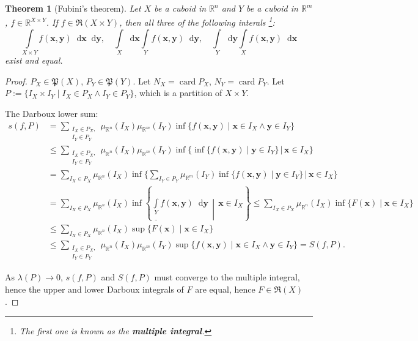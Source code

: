 \documentclass[openany]{book}
\newcommand*{\indexbf}[1]{\emph{\textbf{#1}}\index{#1}} %
\theoremstyle{plain}
\newtheorem{theorem}{Theorem}[section] %
\theoremstyle{definition}
\newcommand{\dif}{\mathop{}\!\mathrm{d}} %
\newcommand*{\bv}{\boldsymbol} %
\DeclareMathOperator{\card}{card}
\begin{document}
\begin{theorem}[Fubini's theorem]
	\label{theorem: Fubini's theorem}
	Let $X$ be a cuboid in $\mathbb R^n$ and $Y$ be a cuboid in $\mathbb R^m$, $f \in \mathbb R^{X \times Y}$. 
	If $f \in \mathfrak R(X \times Y)$, then all three of the following interals%
		\footnote{The first one is known as the \indexbf{multiple integral}.}:
	\begin{equation*}
		\int\limits_{X \times Y} f(\bv x, \bv y) \dif \bv x \dif \bv y, 
		\quad
		\int\limits_X \dif \bv x \int\limits_Y  f(\bv x, \bv y)  \dif \bv y, 
		\quad
		\int\limits_Y \dif \bv y \int\limits_X  f(\bv x, \bv y)  \dif \bv x
	\end{equation*}
	exist and equal.
\end{theorem}
\begin{proof}
	$P_X \in \mathfrak P(X)$, $P_Y \in \mathfrak P(Y)$. 
	Let $N_X = \card P_X$, $N_Y = \card P_Y$.
	Let $P := \{I_X \times I_Y \mid I_X \in P_X \wedge I_Y \in P_Y\}$, which is a partition of $X \times Y$.
	
	The Darboux lower sum:
	\begin{align*}
		s(f, P) &= \sum_{\substack{I_X \in P_X,\\ I_Y \in P_Y}} \mu_{\mathbb R^n}(I_X) \mu_{\mathbb R^m}(I_Y)
			\inf\{f(\bv x, \bv y) \mid \bv x \in I_X \wedge \bv y \in I_Y\}
		\\
		&\leq \sum_{\substack{I_X \in P_X,\\ I_Y \in P_Y}} 
			\mu_{\mathbb R^n}(I_X) \mu_{\mathbb R^m}(I_Y)
			\inf \big\{ \inf \{f(\bv x, \bv y) \mid \bv y \in I_Y  \} 
				\,\big\vert\, \bv x \in I_X \big\}
		\\
		&= \sum_{I_X \in P_X} \mu_{\mathbb R^n}(I_X) 
			\inf \bigg\{ \sum_{I_Y \in P_Y} \mu_{\mathbb R^m}(I_Y) 
				\inf \{ f(\bv x, \bv y) \mid  \bv y \in I_Y\} 
			\,\bigg\vert\, \bv x \in I_X \bigg\}
		\\
		&= \sum_{I_X \in P_X} \mu_{\mathbb R^n}(I_X) 
			\inf \left\{ 
				\underline{\int\limits_Y} f(\bv x, \bv y) \dif \bv y
			\,\middle\vert\, 
				\bv x \in I_X 
			\right\} 
		\leq \sum_{I_X \in P_X} \mu_{\mathbb R^n}(I_X) 
			\inf \{ F(\bv x) \mid \bv x \in I_X \}
		\\
		&\leq \sum_{I_X \in P_X} \mu_{\mathbb R^n}(I_X) 
		\sup \{ F(\bv x) \mid \bv x \in I_X \}
		\\
		&\leq
		\sum_{\substack{I_X \in P_X,\\ I_Y \in P_Y}} \mu_{\mathbb R^n}(I_X) \mu_{\mathbb R^m}(I_Y)
		\sup\{f(\bv x, \bv y) \mid \bv x \in I_X \wedge \bv y \in I_Y\}
		= S(f, P).
	\end{align*}

	As $\lambda(P) \to 0$, $s(f, P)$ and $S(f, P)$ must converge to the multiple integral, hence the upper and lower Darboux integrals of $F$ are equal, hence $F \in \mathfrak R(X)$.
\end{proof}
\end{document}
